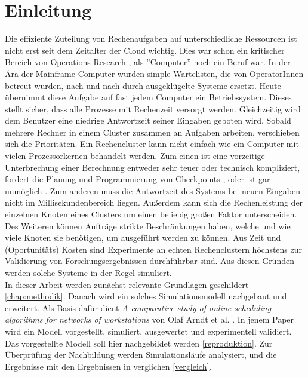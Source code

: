 \chapter{Einleitung}
\label{chap:ein}


Die effiziente Zuteilung von Rechenaufgaben auf unterschiedliche Ressourcen ist nicht erst seit dem Zeitalter der Cloud wichtig. Dies war schon ein kritischer Bereich von Operations Research
, als ''Computer'' noch ein Beruf war.
In der Ära der Mainframe Computer wurden simple Wartelisten, die von OperatorInnen betreut wurden, nach und nach durch ausgeklügelte Systeme ersetzt. %
Heute übernimmt diese Aufgabe auf fast jedem Computer ein Betriebssystem. Dieses stellt sicher, dass alle Prozesse mit Rechenzeit versorgt werden. Gleichzeitig wird dem Benutzer eine niedrige Antwortzeit seiner Eingaben geboten wird. Sobald mehrere Rechner in einem Cluster zusammen an Aufgaben arbeiten, verschieben sich die Prioritäten. Ein Rechencluster kann nicht einfach wie ein Computer mit vielen Prozessorkernen behandelt werden. Zum einen ist eine vorzeitige Unterbrechung einer Berechnung entweder sehr teuer oder technisch kompliziert, fordert die Planung und Programmierung von Checkpoints \cite{IPS15}, oder ist gar unmöglich \cite{adams1979hitchhiker}.
Zum anderen muss die Antwortzeit des Systems bei neuen Eingaben nicht im Millisekundenbereich liegen.
Außerdem kann sich die Rechenleistung der einzelnen Knoten eines Clusters um einen beliebig großen Faktor unterscheiden.
Des Weiteren können Aufträge strikte Beschränkungen haben, welche und  wie viele Knoten sie benötigen, um ausgeführt werden zu können. Aus Zeit und (Oportunitäts) Kosten sind Experimente an echten Rechenclustern höchstens zur Validierung von Forschungsergebnissen durchführbar sind. Aus diesen Gründen werden solche Systeme in der Regel simuliert.\\
In dieser Arbeit werden zunächst relevante Grundlagen geschildert \ref{chap:methodik}.
Danach wird ein solches Simulationsmodell nachgebaut und erweitert. Als Basis dafür dient \emph{A comparative study of online scheduling algorithms for networks of workstations} von Olaf Arndt et al. \cite{Arn99}. In jenem Paper wird ein Modell vorgestellt, simuliert, ausgewertet und experimentell validiert. Das vorgestellte Modell soll hier nachgebildet werden \ref{reproduktion}. Zur Überprüfung der Nachbildung werden Simulationsläufe analysiert, und die Ergebnisse mit den Ergebnissen in \cite{Arn99} verglichen \ref{vergleich}.\\
